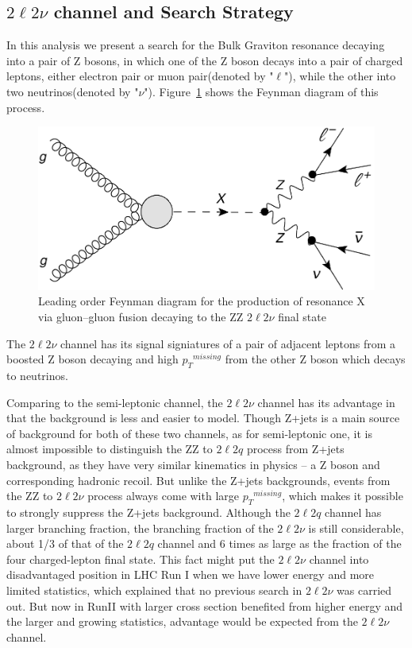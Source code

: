 \subsection{$2\ell 2\nu$ channel and  Search Strategy}
In this analysis we present a search for the Bulk Graviton resonance decaying into a pair of Z bosons, in which one of the Z boson decays into a pair of charged leptons, either electron pair or muon pair(denoted by "$\ell$"), while the other into two neutrinos(denoted by "$\nu$"). Figure~\ref{fig:intro_llnndiagram} shows the Feynman diagram of this process.
\begin{figure}[htbp]
\begin{center}
\includegraphics[width=0.72\linewidth]{figures/intro_llnndiagram.pdf}
\caption{Leading order Feynman diagram for the production of resonance X via gluon–gluon fusion decaying to the ZZ $2\ell 2\nu$ final state}
\label{fig:intro_llnndiagram}
\end{center}
\end{figure}
The $2\ell 2\nu$ channel has its signal signiatures of a pair of adjacent leptons from a boosted Z boson decaying and high ${p_{T}}^{missing}$ from the other Z boson which decays to neutrinos.

\vspace{0.3cm}
Comparing to the semi-leptonic channel, the $2\ell 2\nu$ channel has its advantage in that the background is less and easier to model. Though Z+jets is a main source of background for both of these two channels, as for semi-leptonic one, it is almost impossible to distinguish the ZZ to $2\ell 2q$ process from Z+jets background, as they have very similar kinematics in physics -- a Z boson and corresponding hadronic recoil. But unlike the Z+jets backgrounds, events from the ZZ to $2\ell 2\nu$ process always come with large ${p_{T}}^{missing}$, which makes it possible to strongly suppress the Z+jets background. Although the $2\ell 2q$ channel has larger branching fraction, the branching fraction of the $2\ell 2\nu$ is still considerable, about 1/3 of that of the $2\ell 2q$ channel and 6 times as large as the fraction of the four charged-lepton final state. This fact might put the $2\ell 2\nu$ channel into disadvantaged position in LHC Run I when we have lower energy and more limited statistics, which explained that no previous search in $2\ell 2\nu$ was carried out. But now in RunII with larger cross section benefited from higher energy and the larger and growing statistics, advantage would be expected from the $2\ell 2\nu$ channel.

